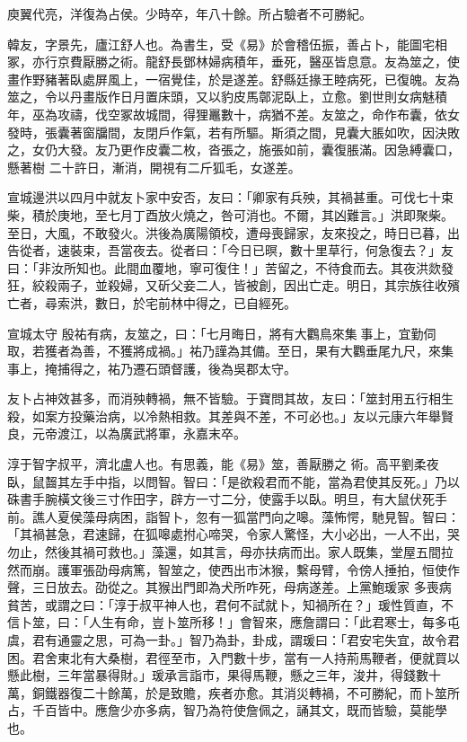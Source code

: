 \begin{pinyinscope}
 庾翼代亮，洋復為占侯。少時卒，年八十餘。所占驗者不可勝紀。



 韓友，字景先，廬江舒人也。為書生，受《易》於會稽伍振，善占卜，能圖宅相冢，亦行京費厭勝之術。龍舒長鄧林婦病積年，垂死，醫巫皆息意。友為筮之，使畫作野豬著臥處屏風上，一宿覺佳，於是遂差。舒縣廷掾王睦病死，已復魄。友為筮之，令以丹畫版作日月置床頭，又以豹皮馬鄣泥臥上，立愈。劉世則女病魅積年，巫為攻禱，伐空冢故城間，得狸鼉數十，病猶不差。友筮之，命作布囊，依女發時，張囊著窗牖間，友閉戶作氣，若有所驅。斯須之間，見囊大脹如吹，因決敗之，女仍大發。友乃更作皮囊二枚，沓張之，施張如前，囊復脹滿。因急縛囊口，懸著樹
 二十許日，漸消，開視有二斤狐毛，女遂差。



 宣城邊洪以四月中就友卜家中安否，友曰：「卿家有兵殃，其禍甚重。可伐七十束柴，積於庚地，至七月丁酉放火燒之，咎可消也。不爾，其凶難言。」洪即聚柴。至日，大風，不敢發火。洪後為廣陽領校，遭母喪歸家，友來投之，時日已暮，出告從者，速裝束，吾當夜去。從者曰：「今日已暝，數十里草行，何急復去？」友曰：「非汝所知也。此間血覆地，寧可復住！」苦留之，不待食而去。其夜洪欻發狂，絞殺兩子，並殺婦，又斫父妾二人，皆被創，因出亡走。明日，其宗族往收殯亡者，尋索洪，數日，於宅前林中得之，已自經死。



 宣城太守
 殷祐有病，友筮之，曰：「七月晦日，將有大鸜鳥來集事上，宜勤伺取，若獲者為善，不獲將成禍。」祐乃謹為其備。至日，果有大鸜垂尾九尺，來集事上，掩捕得之，祐乃遷石頭督護，後為吳郡太守。



 友卜占神效甚多，而消殃轉禍，無不皆驗。于寶問其故，友曰：「筮封用五行相生殺，如案方投藥治病，以冷熱相救。其差與不差，不可必也。」友以元康六年舉賢良，元帝渡江，以為廣武將軍，永嘉末卒。



 淳于智字叔平，濟北盧人也。有思義，能《易》筮，善厭勝之
 術。高平劉柔夜臥，鼠齧其左手中指，以問智。智曰：「是欲殺君而不能，當為君使其反死。」乃以硃書手腕橫文後三寸作田字，辟方一寸二分，使露手以臥。明旦，有大鼠伏死手前。譙人夏侯藻母病困，詣智卜，忽有一狐當門向之嗥。藻怖愕，馳見智。智曰：「其禍甚急，君速歸，在狐嗥處拊心啼哭，令家人驚怪，大小必出，一人不出，哭勿止，然後其禍可救也。」藻還，如其言，母亦扶病而出。家人既集，堂屋五間拉然而崩。護軍張劭母病篤，智筮之，使西出市沐猴，繫母臂，令傍人捶拍，恒使作聲，三日放去。劭從之。其猴出門即為犬所咋死，母病遂差。上黨鮑瑗家
 多喪病貧苦，或謂之曰：「淳于叔平神人也，君何不試就卜，知禍所在？」瑗性質直，不信卜筮，曰：「人生有命，豈卜筮所移！」會智來，應詹謂曰：「此君寒士，每多屯虞，君有通靈之思，可為一卦。」智乃為卦，卦成，謂瑗曰：「君安宅失宜，故令君困。君舍東北有大桑樹，君徑至市，入門數十步，當有一人持荊馬鞭者，便就買以懸此樹，三年當暴得財。」瑗承言詣市，果得馬鞭，懸之三年，浚井，得錢數十萬，銅鐵器復二十餘萬，於是致贍，疾者亦愈。其消災轉禍，不可勝紀，而卜筮所占，千百皆中。應詹少亦多病，智乃為符使詹佩之，誦其文，既而皆驗，莫能學也。




\end{pinyinscope}
